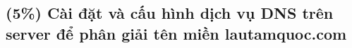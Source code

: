 \subsection{(5\%) Cài đặt và cấu hình dịch vụ DNS trên server để phân giải tên miền
  lautamquoc.com}
\setcounter{figure}{0}
